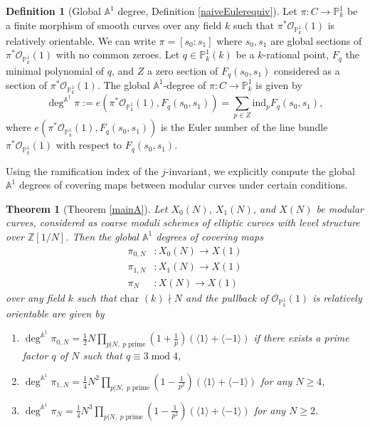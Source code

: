\documentclass[12pt, reqno]{amsart}
\newtheorem*{theorem*}{Theorem}
\theoremstyle{definition}
\newtheorem*{definition*}{Definition}
\newcommand{\Z}{\mathbb{Z}}
\newcommand{\A}{\mathbb{A}} %
\newcommand{\Proj}{\mathbb{P}} %
\newcommand{\Adeg}{\deg^{\mathbb{A}^1}} %
\newcommand{\Oh}{\mathscr{O}} %
\newcommand{\ind}{\mathrm{ind}} %
\begin{document}
\begin{definition*}[Global $\A^1$ degree, Definition \ref{naiveEulerequiv}]
Let $\pi: C \to \mathbb{P}^1_k$ be a finite morphism of smooth curves over any field $k$ such that $\pi^* \Oh_{\Proj^1_k} (1)$ is relatively orientable. We can write $\pi = [s_0: s_1]$ where $s_0, s_1$ are global sections of $\pi^* \Oh_{\Proj^1_k}(1)$ with no common zeroes. Let $q \in \Proj^1_k(k)$ be a $k$-rational point, $F_q$ the minimal polynomial of $q$, and $Z$ a zero section of $F_q(s_0,s_1)$ considered as a section of $\pi^* \Oh_{\Proj^1_k}(1)$. The global $\A^1$-degree of $\pi: C \to \mathbb{P}^1_k$ is given by
\begin{equation*}
    \Adeg \pi := e(\pi^* \Oh_{\Proj^1_k}(1), F_q(s_0,s_1)) = \sum_{p \in Z} \ind_{p} F_q(s_0, s_1),
\end{equation*}
where $e(\pi^* \Oh_{\Proj^1_k}(1), F_q(s_0,s_1))$ is the Euler number of the line bundle $\pi^* \Oh_{\Proj^1_k}(1)$ with respect to $F_q(s_0, s_1)$.
\end{definition*}

Using the ramification index of the $j$-invariant, we explicitly compute the global $\A^1$ degrees of covering maps between modular curves under certain conditions.

\begin{theorem*}[Theorem \ref{mainA}]\label{main1}
Let $X_0(N)$, $X_1(N)$, and $X(N)$ be modular curves, considered as coarse moduli schemes of elliptic curves with level structure over $\Z[1/N]$. Then the global $\A^1$ degrees of covering maps 
\begin{align*}
    \pi_{0,N}&: X_0(N) \to X(1) \\
    \pi_{1,N}&: X_1(N) \to X(1) \\
    \pi_N&: X(N) \to X(1)
\end{align*}
over any field $k$ such that $\text{char }(k) \nmid N$ and the pullback of $\Oh_{\Proj^1_k}(1)$ is relatively orientable are given by
\begin{enumerate}
    \item $\Adeg \pi_{0,N} = \frac{1}{2} N \prod_{p | N, \; p \; \text{prime}} \left(1 + \frac{1}{p} \right) \left(\langle 1 \rangle + \langle -1 \rangle \right) $ if there exists a prime factor $q$ of $N$ such that $q \equiv 3 \; \text{mod} \; 4$,
    \item $\Adeg \pi_{1,N} = \frac{1}{4} N^2 \prod_{p | N, \; p \; \text{prime}} \left(1 - \frac{1}{p^2} \right) \left(\langle 1 \rangle + \langle -1 \rangle \right) $ for any $N \geq 4$,
    \item $\Adeg \pi_N = \frac{1}{4} N^3 \prod_{p | N, \; p \; \text{prime}} \left(1 - \frac{1}{p^2} \right) \left( \langle 1 \rangle + \langle -1 \rangle \right)$ for any $N \geq 2$.
\end{enumerate}
\end{theorem*}
\end{document}
